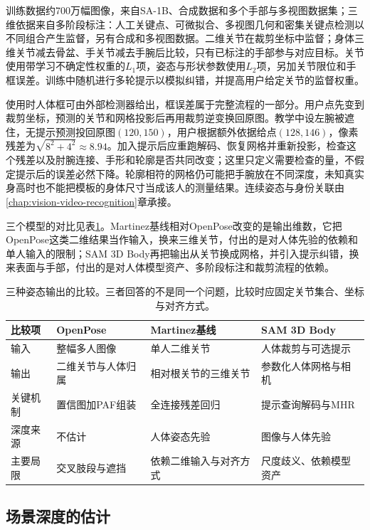 训练数据约700万幅图像，来自SA-1B、合成数据和多个手部与多视图数据集；三维依据来自多阶段标注：人工关键点、可微拟合、多视图几何和密集关键点检测以不同组合产生监督，另有合成和多视图数据。二维关节在裁剪坐标中监督；身体三维关节减去骨盆、手关节减去手腕后比较，只有已标注的手部参与对应目标。关节使用带学习不确定性权重的$L_1$项，姿态与形状参数使用$L_2$项，另加关节限位和手框误差。训练中随机进行多轮提示以模拟纠错，并提高用户给定关节的监督权重。

使用时人体框可由外部检测器给出，框误差属于完整流程的一部分。用户点先变到裁剪坐标，预测的关节和网格投影后再用裁剪逆变换回原图。教学中设左腕被遮住，无提示预测投回原图$(120,150)$，用户根据额外依据给点$(128,146)$，像素残差为$\sqrt{8^2+4^2}\approx8.94$。加入提示后应重跑解码、恢复网格并重新投影，检查这个残差以及肘腕连接、手形和轮廓是否共同改变；这里只定义需要检查的量，不假定提示后的误差必然下降。轮廓相符的网格仍可能把手腕放在不同深度，未知真实身高时也不能把模板的身体尺寸当成该人的测量结果。连续姿态与身份关联由\ref{chap:vision-video-recognition}章承接。

三个模型的对比见表\ref{tab:vision-recognition-pose-compare}。Martinez基线相对OpenPose改变的是输出维数，它把OpenPose这类二维结果当作输入，换来三维关节，付出的是对人体先验的依赖和单人输入的限制；SAM 3D Body再把输出从关节换成网格，并引入提示纠错，换来表面与手部，付出的是对人体模型资产、多阶段标注和裁剪流程的依赖。

\begin{table}[htbp]
 \centering
 \small
 \begin{tabularx}{\linewidth}{@{}lXXX@{}}
 \toprule
 比较项 & OpenPose & Martinez基线 & SAM 3D Body\\
 \midrule
 输入 & 整幅多人图像 & 单人二维关节 & 人体裁剪与可选提示\\
 输出 & 二维关节与人体归属 & 相对根关节的三维关节 & 参数化人体网格与相机\\
 关键机制 & 置信图加PAF组装 & 全连接残差回归 & 提示查询解码与MHR\\
 深度来源 & 不估计 & 人体姿态先验 & 图像与人体先验\\
 主要局限 & 交叉肢段与遮挡 & 依赖二维输入与对齐方式 & 尺度歧义、依赖模型资产\\
 \bottomrule
 \end{tabularx}
 \caption{三种姿态输出的比较。三者回答的不是同一个问题，比较时应固定关节集合、坐标与对齐方式。}
 \label{tab:vision-recognition-pose-compare}
\end{table}

\subsection{场景深度的估计}
\label{sec:vision-recognition-depth}

